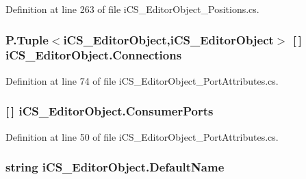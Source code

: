 Definition at line 263 of file i\+C\+S\+\_\+\+Editor\+Object\+\_\+\+Positions.\+cs.

\hypertarget{classi_c_s___editor_object_a98d278f17936555a489ade20c426afc2}{
\subsubsection[{Connections}]{\setlength{\rightskip}{0pt plus 5cm}P.\+Tuple$<${\bf i\+C\+S\+\_\+\+Editor\+Object},{\bf i\+C\+S\+\_\+\+Editor\+Object}$>$ \mbox{[}$\,$\mbox{]} i\+C\+S\+\_\+\+Editor\+Object.\+Connections\hspace{0.3cm}{\ttfamily [get]}}}\label{classi_c_s___editor_object_a98d278f17936555a489ade20c426afc2}


Definition at line 74 of file i\+C\+S\+\_\+\+Editor\+Object\+\_\+\+Port\+Attributes.\+cs.

\hypertarget{classi_c_s___editor_object_a180b74496aa9a357cc7cbd104c006fba}{
\subsubsection[{Consumer\+Ports}]{ \mbox{[}$\,$\mbox{]} i\+C\+S\+\_\+\+Editor\+Object.\+Consumer\+Ports\hspace{0.3cm}{\ttfamily [get]}}}\label{classi_c_s___editor_object_a180b74496aa9a357cc7cbd104c006fba}


Definition at line 50 of file i\+C\+S\+\_\+\+Editor\+Object\+\_\+\+Port\+Attributes.\+cs.

\hypertarget{classi_c_s___editor_object_a3c4dcc458bf68f52a994dad6d4d66ea7}{
\subsubsection[{Default\+Name}]{\setlength{\rightskip}{0pt plus 5cm}string i\+C\+S\+\_\+\+Editor\+Object.\+Default\+Name\hspace{0.3cm}{\ttfamily [get]}}}\label{classi_c_s___editor_object_a3c4dcc458bf68f52a994dad6d4d66ea7}


